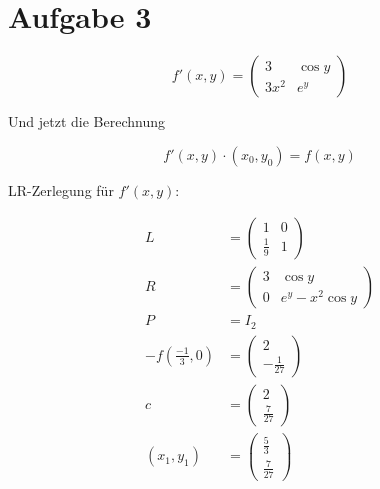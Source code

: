 \section*{Aufgabe 3}
\[f' (x,y) = \begin{pmatrix}
	3     & \cos y\\
	3 x^2 & e^y
\end{pmatrix}\]

Und jetzt die Berechnung

\[f'(x, y) \cdot (x_0, y_0) = f(x,y)\]

LR-Zerlegung für $f'(x, y)$:

\begin{align}
	L &= \begin{pmatrix}1 &0 \\ \frac{1}{9} & 1\end{pmatrix}\\
	R &= \begin{pmatrix}3 & \cos y \\ 0 & e^y - x^2 \cos y\end{pmatrix}\\
	P &= I_2\\
-f ( \frac{-1}{3}, 0) &= \begin{pmatrix} 2\\ -\frac{1}{27}\end{pmatrix}\\
c &= \begin{pmatrix} 2\\ \frac{7}{27} \end{pmatrix}\\
(x_1, y_1) &= \begin{pmatrix} \frac{5}{3}\\ \frac{7}{27}\end{pmatrix}
\end{align}
